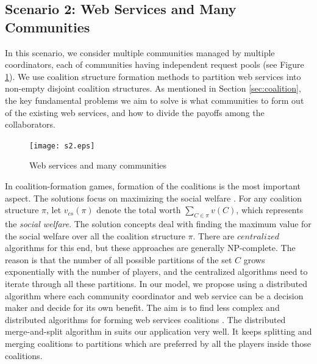 \documentclass[10pt,journal,cspaper,compsoc]{IEEEtran}
\begin{document}
\subsection {Scenario 2: Web Services and Many Communities}

In this scenario, we consider multiple communities managed by
multiple coordinators, each of communities having
independent request pools (see Figure \ref{fig_sim2}). 
We use coalition structure formation methods to
partition web services into non-empty disjoint coalition
structures. As mentioned in Section \ref{sec:coalition}, the key
fundamental problems we aim to solve is what communities to form
out of the existing web services, and how to divide the payoffs
among the collaborators.

\begin{figure}[!t]
\centering
\texttt{[image: s2.eps]}
\caption{Web services and many communities} \label{fig_sim2}
\end{figure}

In coalition-formation games, formation of the coalitions is the
most important aspect. The solutions focus on maximizing the
social welfare \cite{
DBLP:conf/ijcai/GrecoMPS11,Sandholm1999209,DBLP:conf/ijcai/RahwanMJ11}.
For any coalition structure $\pi$, let $v_{cs}(\pi)$ denote the
total worth $\sum_{C \in \pi}{v(C)}$, which represents the
\emph{social welfare}. The solution concepts deal with finding the
maximum value for the social welfare over all the coalition
structure $\pi$. There are $centralized$ algorithms for this end,
but these approaches are generally NP-complete. The reason is that
the number of all possible partitions of the set $C$ grows
exponentially with the number of players, and the centralized
algorithms need to iterate through all these partitions.
In our model, we propose using a distributed algorithm where each
community coordinator and web service can be a decision maker and
decide for its own benefit. The aim is to find less complex and
distributed algorithms for forming web services coalitions
\cite{DBLP:journals/igtr/AptW09,Dieckmann02dynamiccoalition,ray2007game}.
The distributed merge-and-split algorithm in
\cite{DBLP:journals/igtr/AptW09} suits our application very well.
It keeps splitting and merging coalitions to partitions which are
preferred by all the players inside those coalitions.
\end{document}
